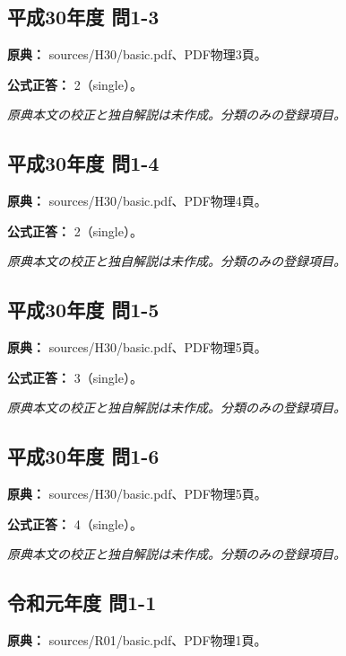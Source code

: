 \subsection{平成30年度 問1-3}
\label{q:h30-reg-basic-1-3}

\noindent\textbf{原典：} sources/H30/basic.pdf、PDF物理3頁。

\textbf{公式正答：} 2（single）。

\par\textit{原典本文の校正と独自解説は未作成。分類のみの登録項目。}

\subsection{平成30年度 問1-4}
\label{q:h30-reg-basic-1-4}

\noindent\textbf{原典：} sources/H30/basic.pdf、PDF物理4頁。

\textbf{公式正答：} 2（single）。

\par\textit{原典本文の校正と独自解説は未作成。分類のみの登録項目。}

\subsection{平成30年度 問1-5}
\label{q:h30-reg-basic-1-5}

\noindent\textbf{原典：} sources/H30/basic.pdf、PDF物理5頁。

\textbf{公式正答：} 3（single）。

\par\textit{原典本文の校正と独自解説は未作成。分類のみの登録項目。}

\subsection{平成30年度 問1-6}
\label{q:h30-reg-basic-1-6}

\noindent\textbf{原典：} sources/H30/basic.pdf、PDF物理5頁。

\textbf{公式正答：} 4（single）。

\par\textit{原典本文の校正と独自解説は未作成。分類のみの登録項目。}

\subsection{令和元年度 問1-1}
\label{q:r01-reg-basic-1-1}

\noindent\textbf{原典：} sources/R01/basic.pdf、PDF物理1頁。

